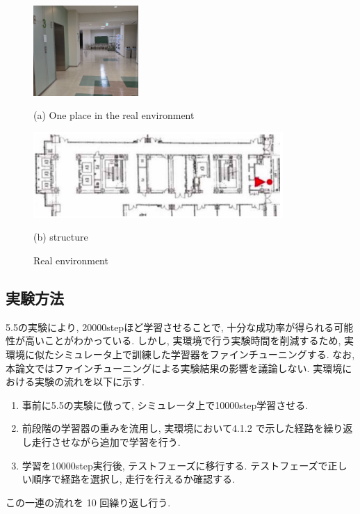 \begin{itemize}
  \begin{figure}[h]
    \centering
    \begin{minipage}[b]{120mm}
      \centering
      \includegraphics[width=40mm]{images/real.png}
      \caption*{(a) One place in the real environment}
    \end{minipage} 
    \begin{minipage}[b]{120mm}
      \centering
      \includegraphics[width=95mm]{images/tsudanuma_structure.png}
      \caption*{(b) structure}
    \end{minipage}
    \caption{Real environment}
    \label{Fig:real_environment}
  \end{figure}
\end{itemize}

\subsection{実験方法}
5.5の実験により, 20000stepほど学習させることで, 十分な成功率が得られる可能性が高いことがわかっている. しかし, 実環境で行う実験時間を削減するため, 実環境に似たシミュレータ上で訓練した学習器をファインチューニングする. なお, 本論文ではファインチューニングによる実験結果の影響を議論しない. 実環境における実験の流れを以下に示す.
\begin{enumerate}
  \item 事前に5.5の実験に倣って, シミュレータ上で10000step学習させる. 
  \item 前段階の学習器の重みを流用し, 実環境において4.1.2 で示した経路を繰り返し走行させながら追加で学習を行う.
  \item 学習を10000step実行後, テストフェーズに移行する. テストフェーズで正しい順序で経路を選択し, 走行を行えるか確認する.
\end{enumerate}
この一連の流れを 10 回繰り返し行う.

